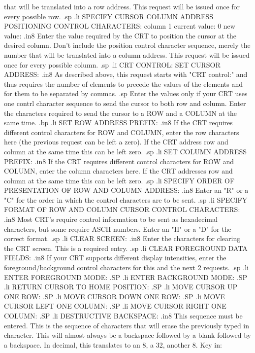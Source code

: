 that will be translated into a row address.  This request will be issued
once for every possible row.
.sp
.li
SPECIFY CURSOR COLUMN ADDRESS POSITIONING CONTROL CHARACTERS:
	column 1   current value:  0
		       new value:
.in8
Enter the value required by the CRT to position the cursor at the desired
column.  Don't include the position control character sequence, merely the
number that will be translated into a column address.  This request will
be issued once for every possible column.
.sp
.li
CRT CONTROL:  SET CURSOR ADDRESS:
.in8
As described above, this request starts with "CRT control:" and thus requires
the number of elements to precede the values of the elements and for them to
be separated by commas.
.sp
Enter the values only if your CRT uses one contrl character sequence to send
the cursor to both row and column.  Enter the characters required to send the
cursor to a ROW and a COLUMN at the same time.
.bp
.li
SET ROW ADDRESS PREFIX:
.in8
If the CRT requires different control characters for ROW and COLUMN, enter
the row characters here (the previous request can be left a zero).  If the
CRT address row and column at the same time this can be left zero.
.sp
.li
SET COLUMN ADDRESS PREFIX:
.in8
If the CRT requires different control characters for ROW and COLUMN, enter
the column characters here.  If the CRT addresses row and column at the same
time this can be left zero.
.sp
.li
SPECIFY ORDER OF PRESENTATION OF ROW AND COLUMN ADDRESS:
.in8
Enter an "R" or a "C" for the order in which the control characters are to
be sent.
.sp
.li
SPECIFY FORMAT OF ROW AND COLUMN CURSOR CONTROL CHARACTERS:
.in8
Most CRT's require control information to be sent as hexadecimal characters,
but some require ASCII numbers.  Enter an "H" or a "D" for the correct format.
.sp
.li
CLEAR SCREEN:
.in8
Enter the characters for clearing the CRT screen.  This is a required entry.
.sp
.li
CLEAR FOREGROUND DATA FIELDS:
.in8
If your CRT supports different display intensities, enter the
foreground/background
control characters for this and the next 2 requests.
.sp
.li
ENTER FOREGROUND MODE:
.SP
.li
ENTER BACKGROUND MODE:
.SP
.li
RETURN CURSOR TO HOME POSITION:
.SP
.li
MOVE CURSOR UP ONE ROW:
.SP
.li
MOVE CURSOR DOWN ONE ROW:
.SP
.li
MOVE CURSOR LEFT ONE COLUMN:
.SP
.li
MOVE CURSOR RIGHT ONE COLUMN:
.SP
.li
DESTRUCTIVE BACKSPACE:
.in8
This sequence must be entered.	This is the sequence of characters
that will erase the previously typed in character.  This will
almost always be a backspace followed by a blank followed by a backspace.
In decimal, this translates to an 8, a 32, another 8.  Key in:
